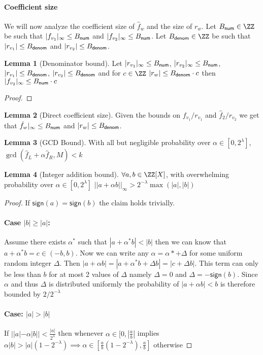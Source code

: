 \documentclass{article}
\theoremstyle{definition}
\newtheorem{lemma}{Lemma}
\begin{document}
 

\paragraph{Coefficient size}
We will now analyze the coefficient size of $\hat{f}_w$ and the size of $r_w$. Let $\BoundNum\in \ZZ$ be such that $|f_{v_1}|_\infty \leq B_{\textsf{num}}$ and  $|f_{v_2}|_\infty \leq B_{\textsf{num}}$. Let $\BoundDenom\in \ZZ$ be such that $|r_{v_1}|\leq B_{\textsf{denom}}$ and $|r_{v_2}|\leq B_{\textsf{denom}}$. 
\begin{lemma}[Denominator bound]
	Let $|r_{v_1}|_\infty \leq B_{\textsf{num}}$, $|r_{v_2}|_\infty \leq B_{\textsf{num}}$, $|r_{v_1}| \leq B_{\textsf{denom}}$, $|r_{v_2}| \leq B_{\textsf{denom}}$ and for $c\in \ZZ$ $|r_{w}|\leq B_{\textsf{denom}} \cdot c$ then $|f_{v_2}|_\infty \leq B_{\textsf{num}} \cdot c$
\end{lemma}
\begin{proof}

\end{proof}

\begin{lemma}[Direct coefficient size]
Given the bounds on $f_{v_1}/r_{v_1}$ and $\hat{f}_2/r_{v_2}$ we get that $\hat{f}_{w}|_\infty \leq B_{\textsf{num}}$ and  $|r_w| \leq B_{\textsf{denom}}$. 
\end{lemma}
\begin{lemma}[GCD Bound]
	With all but negligible probability over $\alpha \in [0,2^\lambda]$, $\gcd(\hat{f}_L+ \alpha \hat{f}_R,M)<k$
\end{lemma}
\begin{lemma}[Integer addition bound]
$\forall a,b \in \ZZ[X]$, with overwhelming probability over $\alpha \in [0,2^\lambda]$ $||a+\alpha b||_\infty >2^{-\lambda} \max(|a|,|b|)$
\end{lemma}
\begin{proof}
If $\textsf{sign}(a)=\textsf{sign}(b)$ the claim holds trivially. 
\paragraph{Case $|b|\geq|a|$:}
Assume there exists $\alpha^*$ such that $|a+\alpha^* b|<|b|$ then we can know that $a+\alpha^* b=c \in (-b,b)$. Now we can write any $\alpha=\alpha*+\Delta$ for some uniform random integer $\Delta$. Then $|a+\alpha b|=|a+\alpha^* b + \Delta b|=|c+\Delta b|$. This term can only be less than $b$ for at most 2 values of $\Delta$ namely $\Delta=0$ and $\Delta=-\textsf{sign}(b)$. Since $\alpha$ and thus $\Delta$ is distributed uniformly the probability of $|a+\alpha b|<b$ is therefore bounded by $2/2^{-\lambda}$

\paragraph{Case: $|a|> |b|$}
If $||a|-\alpha |b|| <\frac{|a|}{2^\lambda}$ then whenever $\alpha \in [0,|\frac{a}{b}|$ implies $\alpha |b|>|a|(1-2^{-\lambda}) \implies \alpha \in [\frac{a}{b}(1-2^{-\lambda}),\frac{a}{b}]$ otherwise 
\end{proof}
\end{document}

